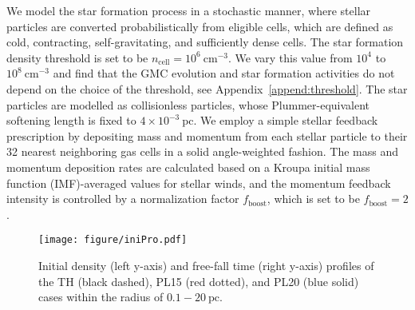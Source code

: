 \documentclass[fleqn,usenatbib]{mnras}
\begin{document}
We model the star formation process in a stochastic manner, where stellar particles are converted probabilistically from eligible cells, which are defined as cold, contracting, self-gravitating, and sufficiently dense cells.
The star formation density threshold is set to be $n_{\mathrm{cell}}=10^6\ \mathrm{cm^{-3}}$.
We vary this value from $10^4$ to $10^8\ \mathrm{cm^{-3}}$ and find that the GMC evolution and star formation activities do not depend on the choice of the threshold, see Appendix~\ref{append:threshold}.
The star particles are modelled as collisionless particles, whose Plummer-equivalent softening length is fixed to $4\times 10^{-3}\ \mathrm{pc}$. 
We employ a simple stellar feedback prescription by depositing mass and momentum from each stellar particle to their 32 nearest neighboring gas cells in a solid angle-weighted fashion.
The mass and momentum deposition rates are calculated based on a Kroupa initial mass function (IMF)-averaged values \citep{kroupa_variation_2001} for stellar winds, and the momentum feedback intensity is controlled by a normalization factor $f_{\mathrm{boost}}$, which is set to be $f_{\mathrm{boost}}=2$.

\begin{figure}
	\texttt{[image: figure/iniPro.pdf]}
    \caption{Initial density (left y-axis) and free-fall time (right y-axis) profiles of the TH (black dashed), PL15 (red dotted), and PL20 (blue solid) cases within the radius of $0.1-20\ \mathrm{pc}$.}
    \label{fig:iniPro}
\end{figure}
\end{document}
